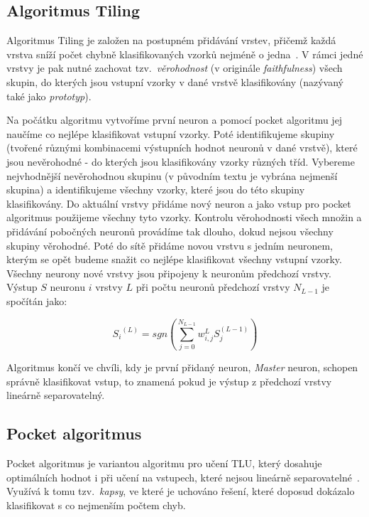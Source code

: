 \documentclass[a4paper, 11pt]{article}
\begin{document}
\subsection*{Algoritmus Tiling}
Algoritmus Tiling je založen na postupném přidávání vrstev, přičemž každá vrstva sníží počet chybně klasifikovaných vzorků nejméně o jedna~\cite{mezard}. V rámci jedné vrstvy je pak nutné zachovat tzv.\ \emph{věrohodnost} (v originále \emph{faithfulness}) všech skupin, do kterých jsou vstupní vzorky v dané vrstvě klasifikovány (nazývaný také jako \emph{prototyp}).

Na počátku algoritmu vytvoříme první neuron a pomocí pocket algoritmu jej naučíme co nejlépe klasifikovat vstupní vzorky. Poté identifikujeme skupiny (tvořené různými kombinacemi výstupních hodnot neuronů v dané vrstvě), které jsou nevěrohodné - do kterých jsou klasifikovány vzorky různých tříd. Vybereme nejvhodnější nevěrohodnou skupinu (v původním textu je vybrána nejmenší skupina) a identifikujeme všechny vzorky, které jsou do této skupiny klasifikovány. Do aktuální vrstvy přidáme nový neuron a jako vstup pro pocket algoritmus použijeme všechny tyto vzorky. Kontrolu vě\-ro\-hod\-nos\-ti všech množin a přidávání pobočných neuronů provádíme tak dlouho, dokud nejsou všechny skupiny věrohodné. Poté do sítě přidáme novou vrstvu s jedním neuronem, kterým se opět budeme snažit co nejlépe klasifikovat všechny vstupní vzorky. Všechny neurony nové vrstvy jsou při\-po\-je\-ny k neuronům předchozí vrstvy. Výstup $S$ neuronu $i$ vrstvy $L$ při počtu neuronů předchozí vrstvy $N_{L-1}$ je spočítán jako:

\begin{equation*}
  {S_i}^{(L)}=sgn\left(\sum_{j=0}^{N_{L-1}} w_{i,j}^{L}S_{j}^{(L-1)}\right)
\end{equation*}

Algoritmus končí ve chvíli, kdy je první přidaný neuron, \emph{Master} neuron, schopen správně klasifikovat vstup, to znamená pokud je výstup z předchozí vrstvy lineárně separovatelný.

\subsection*{Pocket algoritmus}
Pocket algoritmus je variantou algoritmu pro učení TLU, který dosahuje optimálních hodnot i při učení na vstupech, které nejsou lineárně separovatelné~\cite{ranka}. Využívá k tomu tzv.\ \emph{kapsy}, ve které je uchováno řešení, které doposud dokázalo klasifikovat s co nejmenším počtem chyb.
\end{document}
